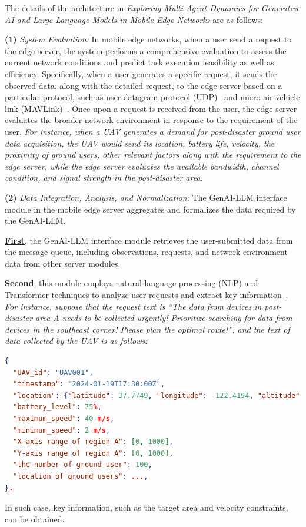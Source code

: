 \documentclass[twoside,11pt]{reviewresponse}
\theoremstyle{plain}
\theoremstyle{plain}
\begin{document}
\par The details of the architecture in \textit{Exploring Multi-Agent Dynamics for Generative AI and Large Language Models in Mobile Edge Networks} are as follows:

\par \textbf{(1)} \textit{System Evaluation:} In mobile edge networks, when a user send a request to the edge server, the system performs a comprehensive evaluation to assess the current network conditions and predict task execution feasibility as well as efficiency. Specifically, when a user generates a specific request, it sends the observed data, along with the detailed request, to the edge server based on a particular protocol, such as user datagram protocol (UDP)~\cite{UDP} and micro air vehicle link (MAVLink)~\cite{MAVLink}. Once upon a request is received from the user, the edge server evaluates the broader network environment in response to the requirement of the user. \textit{For instance, when a UAV generates a demand for post-disaster ground user data acquisition, the UAV would send its location, battery life, velocity, the proximity of ground users, other relevant factors along with the requirement to the edge server, while the edge server evaluates the available bandwidth, channel condition, and signal strength in the post-disaster area.} 

\par \textbf{(2)} \textit{Data Integration, Analysis, and Normalization:} The GenAI-LLM interface module in the mobile edge server aggregates and formalizes the data required by the GenAI-LLM. 
    
\par \textbf{\ul{First}}, the GenAI-LLM interface module retrieves the user-submitted data from the message queue, including observations, requests, and network environment data from other server modules. 

\par \textbf{\ul{Second}}, this module employs natural language processing (NLP) and Transformer techniques to analyze user requests and extract key information~\cite{Transformer}. \textit{For instance, suppose that the request text is \enquote{The data from devices in post-disaster area A needs to be collected urgently! Prioritize searching for data from devices in the southeast corner! Please plan the optimal route!}, and the text of data collected by the UAV is as follows:}
\begin{lstlisting}[language=json]
{
  "UAV_id": "UAV001",
  "timestamp": "2024-01-19T17:30:00Z",
  "location": {"latitude": 37.7749, "longitude": -122.4194, "altitude": 100},
  "battery_level": 75%,
  "maximum_speed": 40 m/s,
  "minimum_speed": 2 m/s,
  "X-axis range of region A": [0, 1000],
  "Y-axis range of region A": [0, 1000],
  "the number of ground user": 100,
  "location of ground users": ...,
}.
\end{lstlisting}
\noindent In such case, key information, such as the target area and velocity constraints, can be obtained. 
\end{document}
